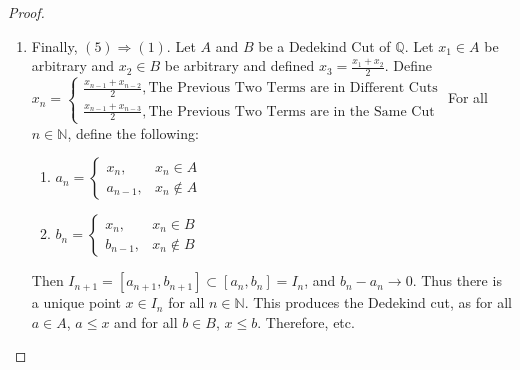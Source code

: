 \documentclass[crop=false,class=book,oneside]{standalone}
\begin{document}
\begin{proof}
\begin{enumerate}
            \item Finally, $(5)\Rightarrow (1)$. Let $A$ and $B$ be a Dedekind Cut of $\mathbb{Q}$. Let $x_1 \in A$ be arbitrary and $x_2 \in B$ be arbitrary and defined $x_3 = \frac{x_1+x_2}{2}$. Define\\ $x_n = \begin{cases} \frac{x_{n-1}+x_{n-2}}{2}, \textrm{The Previous Two Terms are in Different Cuts}\\\frac{x_{n-1}+x_{n-3}}{2}, \textrm{The Previous Two Terms are in the Same Cut}\end{cases}$
            For all $n\in \mathbb{N}$, define the following:
            \begin{paracol}{2}
            \begin{enumerate}
            \item $a_n = \begin{cases} x_n, & x_n \in A \\ a_{n-1}, & x_n \notin A\end{cases}$
            \switchcolumn
            \item $b_n = \begin{cases} x_n, & x_n \in B \\ b_{n-1}, & x_n \notin B\end{cases}$
            \end{enumerate}
            \end{paracol}
            Then $I_{n+1} = [a_{n+1},b_{n+1}] \subset [a_n,b_n]=I_n$, and $b_n-a_n \rightarrow 0$. Thus there is a unique point $x\in I_n$ for all $n\in \mathbb{N}$. This produces the Dedekind cut, as for all $a\in A$, $a\leq x$ and for all $b\in B$, $x\leq b$. Therefore, etc.
            \end{enumerate}
            \end{proof}
\end{document}
